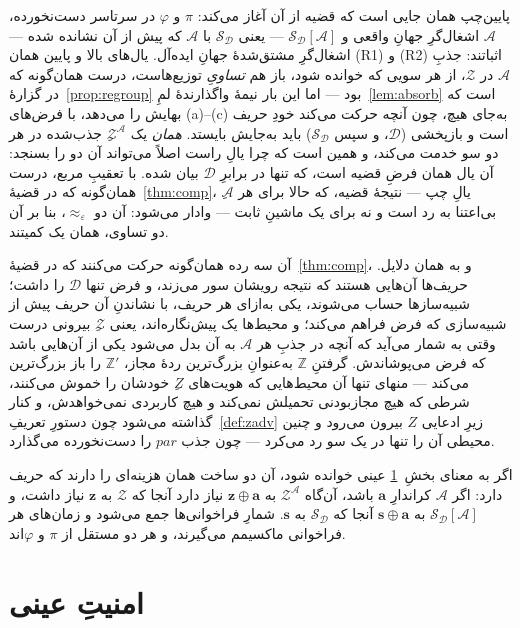 \documentclass[10pt,oneside,openany]{book}
\newcommand{\pars}{\mathit{par}}
\newcommand{\Zenv}{\mathcal{Z}}
\newcommand{\Adv}{\mathcal{A}}
\newcommand{\Dum}{\mathcal{D}}
\newcommand{\Sim}{\mathcal{S}}
\newcommand{\bd}[1]{\mathbf{#1}}
\newcommand{\ZenvSet}{\mathbb{Z}}
\theoremstyle{accentdef}
\theoremstyle{accentplain}
\begin{document}
پایین‌چپ همان جایی است که قضیه از آن آغاز می‌کند: $\pi$ و $\varphi$ در
سرتاسر دست‌نخورده، $\Adv$ اشغال‌گرِ جهانِ واقعی و $\Sim_{\Dum}[\Adv]$ ---
یعنی $\Sim_{\Dum}$ با $\Adv$ که پیش از آن نشانده شده --- اشغال‌گرِ
مشتق‌شدهٔ جهانِ ایده‌آل. یال‌های بالا و پایین همان (R1) و (R2)ِ اثباتند:
جذبِ $\Adv$ در $\Zenv$، از هر سویی که خوانده شود، باز هم \emph{تساویِ}
توزیع‌هاست، درست همان‌گونه که در گزارهٔ~\ref{prop:regroup} بود --- اما این
بار نیمهٔ واگذارندهٔ لمِ~\ref{lem:absorb} است که بهایش را می‌دهد، با
فرض‌های (a)--(c) به‌جای هیچ، چون آنچه حرکت می‌کند خودِ حریف است و بازپخشی
($\Dum$، و سپس $\Sim_{\Dum}$) باید به‌جایش بایستد. \emph{همان} یک
$\Zenv^{\Adv}$ِ جذب‌شده در هر دو سو خدمت می‌کند، و همین است که چرا یالِ
راست اصلاً می‌تواند آن دو را بسنجد: آن یال همان فرضِ قضیه است، که تنها در
برابرِ $\Dum$ بیان شده. با تعقیبِ مربع، درست همان‌گونه که در
قضیهٔ~\ref{thm:comp}، یالِ چپ --- نتیجهٔ قضیه، که حالا برای هر $\Adv$ِ
بی‌اعتنا به رد است و نه برای یک ماشینِ ثابت --- وادار می‌شود: آن دو
$\approx_\varepsilon$، بنا بر آن دو تساوی، همان یک کمیتند.

آن سه رده همان‌گونه حرکت می‌کنند که در قضیهٔ~\ref{thm:comp}، و به همان
دلایل. حریف‌ها آن‌هایی هستند که نتیجه رویشان سور می‌زند، و فرض تنها $\Dum$
را داشت؛ شبیه‌سازها حساب می‌شوند، یکی به‌ازای هر حریف، با نشاندنِ آن حریف
پیش از شبیه‌سازی که فرض فراهم می‌کند؛ و محیط‌ها یک پیش‌نگاره‌اند، یعنی
$\Zenv$ِ بیرونی درست وقتی به شمار می‌آید که آنچه در جذبِ هر $\Adv$ به آن
بدل می‌شود یکی از آن‌هایی باشد که فرض می‌پوشاندش. گرفتنِ $\ZenvSet$
به‌عنوانِ بزرگ‌ترین ردهٔ مجاز، $\ZenvSet'$ را باز بزرگ‌ترین می‌کند ---
منهای تنها آن محیط‌هایی که هویت‌های $Z$ِ خودشان را خموش می‌کنند، شرطی که
هیچ مجازبودنی تحمیلش نمی‌کند و هیچ کاربردی نمی‌خواهدش، و کنار گذاشته
می‌شود چون دستورِ تعریفِ~\ref{def:zadv} زیرِ ادعایی $Z$ بیرون می‌رود و چنین
محیطی آن را تنها در یک سو رد می‌کرد --- چون جذب $\pars$ را دست‌نخورده
می‌گذارد.

اگر به معنای بخشِ~\ref{sec:concrete} عینی خوانده شود، آن دو ساخت همان
هزینه‌ای را دارند که حریف دارد: اگر $\Adv$ کراندارِ $\bd{a}$ باشد، آن‌گاه
$\Zenv^{\Adv}$ به $\bd{z} \oplus \bd{a}$ نیاز دارد آنجا که $\Zenv$ به
$\bd{z}$ نیاز داشت، و $\Sim_{\Dum}[\Adv]$ به $\bd{s} \oplus \bd{a}$ آنجا
که $\Sim_{\Dum}$ به $\bd{s}$. شمارِ فراخوانی‌ها جمع می‌شود و زمان‌های هر
فراخوانی ماکسیمم می‌گیرند، و هر دو مستقل از $\pi$ و $\varphi$اند.

\section{امنیتِ عینی}\label{sec:concrete}
\end{document}
